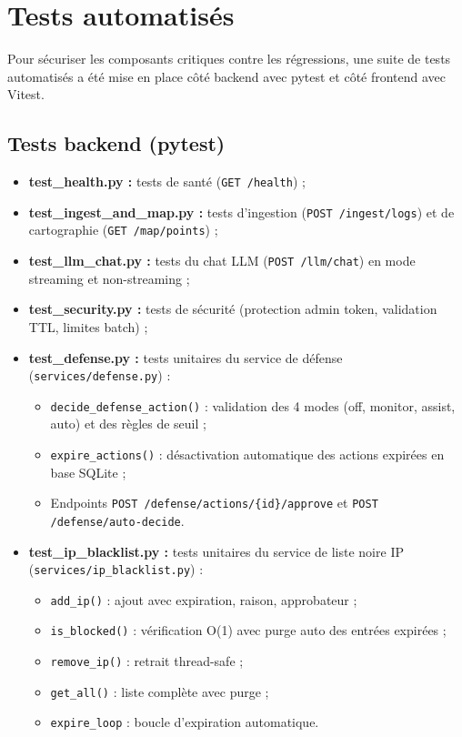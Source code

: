 \documentclass[12pt,a4paper]{report}
\begin{document}
\section{Tests automatisés}
\begin{onehalfspace}
Pour sécuriser les composants critiques contre les régressions, une suite
de tests automatisés a été mise en place côté backend avec pytest et côté
frontend avec Vitest.

\subsection*{Tests backend (pytest)}
\begin{itemize}
  \item[\ding{43}] \textbf{test\_health.py :} tests de santé (\texttt{GET /health}) ;
  \item[\ding{43}] \textbf{test\_ingest\_and\_map.py :} tests d'ingestion
  (\texttt{POST /ingest/logs}) et de cartographie (\texttt{GET /map/points}) ;
  \item[\ding{43}] \textbf{test\_llm\_chat.py :} tests du chat LLM
  (\texttt{POST /llm/chat}) en mode streaming et non-streaming ;
  \item[\ding{43}] \textbf{test\_security.py :} tests de sécurité (protection
  admin token, validation TTL, limites batch) ;
  \item[\ding{43}] \textbf{test\_defense.py :} tests unitaires du service de
  défense (\texttt{services/defense.py}) :
  \begin{itemize}
    \item \texttt{decide\_defense\_action()} : validation des 4 modes
    (off, monitor, assist, auto) et des règles de seuil ;
    \item \texttt{expire\_actions()} : désactivation automatique des actions
    expirées en base SQLite ;
    \item Endpoints \texttt{POST /defense/actions/\{id\}/approve} et
    \texttt{POST /defense/auto-decide}.
  \end{itemize}
  \item[\ding{43}] \textbf{test\_ip\_blacklist.py :} tests unitaires du service
  de liste noire IP (\texttt{services/ip\_blacklist.py}) :
  \begin{itemize}
    \item \texttt{add\_ip()} : ajout avec expiration, raison, approbateur ;
    \item \texttt{is\_blocked()} : vérification O(1) avec purge auto des
    entrées expirées ;
    \item \texttt{remove\_ip()} : retrait thread-safe ;
    \item \texttt{get\_all()} : liste complète avec purge ;
    \item \texttt{expire\_loop} : boucle d'expiration automatique.
  \end{itemize}
\end{itemize}


\end{onehalfspace}
\end{document}
